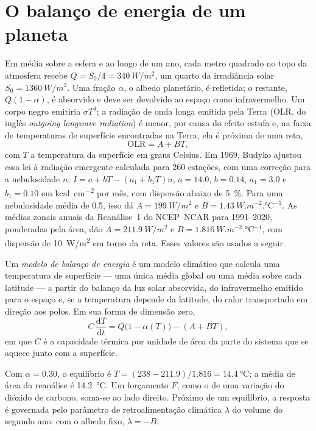 \section{O balanço de energia de um planeta}\label{sec:b3:climate-models:zero-d}

Em média sobre a esfera e ao longo de um ano, cada metro quadrado no topo
da atmosfera recebe $Q = S_0/4 = \qty{340}{W/m^2}$, um quarto da
irradiância solar $S_0 = \qty{1360}{W/m^2}$. Uma fração $\alpha$, o
albedo planetário, é refletida; o restante, $Q(1 - \alpha)$, é absorvido e
deve ser devolvido ao espaço como infravermelho. Um corpo negro emitiria $\sigma
T^4$; a radiação de onda longa emitida pela Terra (OLR, do inglês \textit{outgoing longwave radiation}) é menor, por causa do
efeito estufa e, na faixa de temperaturas de superfície encontradas na
Terra, ela é próxima de uma reta,
\[
\text{OLR} = A + BT ,
\]
com $T$ a temperatura da superfície em graus Celsius. Em 1969, Budyko ajustou
essa lei à radiação emergente calculada para 260 estações, com uma correção para
a nebulosidade $n$: $I = a + bT - (a_1 + b_1T)n$, $a = 14.0$, $b = 0.14$, $a_1 =
3.0$ e $b_1 = 0.10$ em \unit{kcal.cm^{-2}} por mês, com dispersão abaixo de
\qty{5}{\percent}. Para uma nebulosidade média de 0.5, isso dá $A =
\qty{199}{W/m^2}$ e $B = \qty{1.43}{W.m^{-2}.\celsius^{-1}}$. As
médias zonais anuais da Reanálise~1 do NCEP--NCAR para 1991--2020, ponderadas pela área,
dão $A = \qty{211.9}{W/m^2}$ e $B = \qty{1.816}{W.m^{-2}.\celsius^{-1}}$,
com dispersão de \qty{10}{W/m^2} em torno da reta. Esses valores são usados
a seguir.

\begin{definition}\label{def:b3:climate-models:ebm}
Um \emph{modelo de balanço de energia} é um modelo climático
que calcula uma temperatura de superfície --- uma única média global ou uma
média sobre cada latitude --- a partir do balanço da luz solar absorvida, do
infravermelho emitido para o espaço e, se a temperatura depende da latitude, do
calor transportado em direção aos polos. Em sua forma de dimensão zero,
\[
C\,\frac{\mathrm dT}{\mathrm dt} = Q\big(1 - \alpha(T)\big) - (A + BT) ,
\]
em que $C$ é a capacidade térmica por unidade de área da parte do sistema que
se aquece junto com a superfície.
\end{definition}

Com $\alpha = 0.30$, o equilíbrio é $T = (238 - 211.9)/1.816 =
\qty{14.4}{\celsius}$; a média de área da reanálise é
\qty{14.2}{\celsius}. Um forçamento $F$, como o de uma variação do
dióxido de carbono, soma-se ao lado direito. Próximo de um equilíbrio, a resposta é
governada pelo parâmetro de retroalimentação climática $\lambda$ do volume do segundo ano:
com o albedo fixo, $\lambda = -B$.

